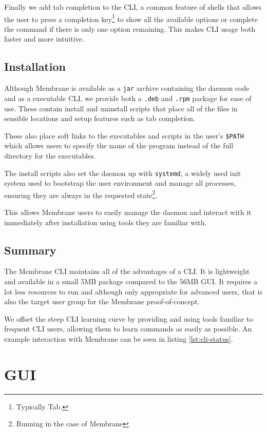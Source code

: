 \documentclass[11pt, a4paper, twoside]{report}
\def\code#1{\texttt{#1}}
\begin{document}
Finally we add tab completion to the CLI, a common feature of shells that allows the user to press a completion key\footnote{Typically Tab.} to show all the available options or complete the command if there is only one option remaining. This makes CLI usage both faster and more intuitive.

\subsection{Installation}

Although Membrane is available as a \code{jar} archive containing the daemon code and as a executable CLI, we provide both a \code{.deb} and \code{.rpm} package for ease of use. These contain install and uninstall scripts that place all of the files in sensible locations and setup features such as tab completion.

These also place soft links to the executables and scripts in the user's \code{\$PATH} which allows users to specify the name of the program instead of the full directory for the executables.

The install scripts also set the daemon up with \code{systemd}, a widely used init system \citep{saunders2015systemd} used to bootstrap the user environment and manage all processes, ensuring they are always in the requested state\footnote{Running in the case of Membrane}.

This allows Membrane users to easily manage the daemon and interact with it immediately after installation using tools they are familiar with.

\subsection{Summary}

The Membrane CLI maintains all of the advantages of a CLI. It is lightweight and available in a small 5MB package compared to the 56MB GUI. It requires a lot less resources to run and although only appropriate for advanced users, that is also the target user group for the Membrane proof-of-concept.

We offset the steep CLI learning curve by providing and using tools familiar to frequent CLI users, allowing them to learn commands as easily as possible. An example interaction with Membrane can be seen in listing \ref{lst:cli-status}.

\section{GUI}
\end{document}
